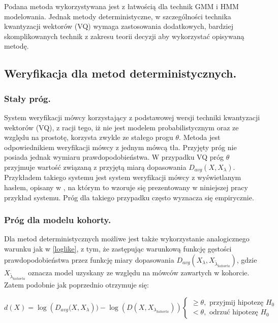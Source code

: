 Podana metoda wykorzystywana jest z łatwością dla technik GMM i HMM modelowania. Jednak metody deterministyczne, w szczególności technika kwantyzacji wektorów (VQ) wymaga zastosowania dodatkowych, bardziej skomplikowanych technik z zakresu teorii decyzji aby wykorzystać opisywaną metodę. 

\subsection{Weryfikacja dla metod deterministycznych.}
\subsubsection{Stały próg.}
\label{fixed}
System weryfikacji mówcy korzystający z podstawowej wersji techniki kwantyzacji wektorów (VQ), z racji tego, iż nie jest modelem probabilistycznym oraz ze względu na prostotę, korzysta zwykle ze stałego progu $\theta$. Metoda jest odpowiednikiem weryfikacji mówcy z jednym mówcą tła. Przyjęty próg nie posiada jednak wymiaru prawdopodobieństwa. W przypadku VQ próg $\theta$ przyjmuje wartość związaną z przyjętą miarą dopasowania $D_{avg}(X, X_{\lambda})$. Przykładem takiego systemu jest system weryfikacji mówcy z wyświetlanym hasłem, opisany w \cite{10digits92}, na którym to wzoruje się prezentowany w niniejszej pracy przykład systemu. Próg dla takiego przypadku często wyznacza się empirycznie. 

\subsubsection{Próg dla modelu kohorty.}
Dla metod deterministycznych możliwe jest także wykorzystanie analogicznego warunku jak w \ref{loglike}, z tym, że zastępując warunkową funkcję gęstości prawdopodobieństwa przez funkcję miary dopasowania $D_{avg}(X_{\lambda}, X_{\tilde{\lambda}_{kohorta}})$, gdzie $X_{\tilde{\lambda}_{kohorta}}$ oznacza model uzyskany ze względu na mówców zawartych w kohorcie. Zatem podobnie jak poprzednio otrzymuje się:

\begin{equation}
  \label{loglikedis}
  d(X)= \log({D_{avg} (X, X_{\lambda}})) - \log(D(X, X_{\lambda_{kohorta}}))
  \begin{cases}
    \ge \theta, \textrm{ przyjmij hipotezę } H_0 \\
    < \theta, \textrm{ odrzuć hipotezę } H_0
  \end{cases}
\end{equation}

